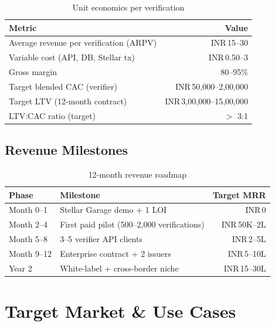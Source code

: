 \documentclass[11pt,a4paper]{article}
\newcommand{\stellar}{\textsf{Stellar}}
\begin{document}
\begin{table}[H]
  \centering
  \caption{Unit economics per verification}
  \renewcommand{\arraystretch}{1.2}
  \begin{tabular}{@{}lr@{}}
    \toprule
    \textbf{Metric} & \textbf{Value} \\
    \midrule
    Average revenue per verification (ARPV) & INR\,15--30 \\
    Variable cost (API, DB, \stellar{} tx) & INR\,0.50--3 \\
    Gross margin & 80--95\% \\
    Target blended CAC (verifier) & INR\,50,000--2,00,000 \\
    Target LTV (12-month contract) & INR\,3,00,000--15,00,000 \\
    LTV:CAC ratio (target) & $>$ 3:1 \\
    \bottomrule
  \end{tabular}
\end{table}

\subsection{Revenue Milestones}

\begin{table}[H]
  \centering
  \caption{12-month revenue roadmap}
  \renewcommand{\arraystretch}{1.2}
  \begin{tabularx}{\textwidth}{@{}l X r@{}}
    \toprule
    \textbf{Phase} & \textbf{Milestone} & \textbf{Target MRR} \\
    \midrule
    Month 0--1 & Stellar Garage demo + 1 LOI & INR\,0 \\
    Month 2--4 & First paid pilot (500--2,000 verifications) & INR\,50K--2L \\
    Month 5--8 & 3--5 verifier API clients & INR\,2--5L \\
    Month 9--12 & Enterprise contract + 2 issuers & INR\,5--10L \\
    Year 2 & White-label + cross-border niche & INR\,15--30L \\
    \bottomrule
  \end{tabularx}
\end{table}

\section{Target Market \& Use Cases}
\end{document}
